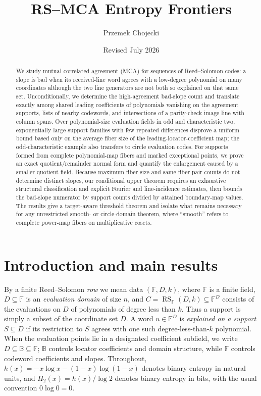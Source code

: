 \documentclass[12pt,a4paper]{amsart}
\title{RS--MCA Entropy Frontiers}
\author{Przemek Chojecki}
\date{Revised July 2026}
\numberwithin{equation}{section}
\theoremstyle{remark}
\DeclareMathOperator{\RS}{RS}
\newcommand{\F}{\mathbb F}
\newcommand{\B}{\mathbb B}
\begin{document}
\begin{abstract}
We study mutual correlated agreement (MCA) for sequences of Reed--Solomon
codes: a slope is bad when its received-line word agrees with a low-degree
polynomial on many coordinates although the two line generators are not
both so explained on that same set.  Unconditionally, we determine the
high-agreement bad-slope count and translate exactly among shared leading
coefficients of polynomials vanishing on the agreement supports, lists of
nearby codewords, and intersections of a parity-check image line with
column spans.  Over polynomial-size evaluation
fields in odd and characteristic two, exponentially large support families
with few repeated differences disprove a uniform bound based only on the
average fiber size of the leading-locator-coefficient map; the
odd-characteristic example also transfers to circle evaluation codes.  For
supports formed from complete polynomial-map
fibers and marked exceptional points, we prove an exact quotient/remainder
normal form and quantify the enlargement caused by a smaller quotient
field.  Because maximum fiber size and same-fiber pair counts do not
determine distinct slopes, our conditional upper theorem requires an
exhaustive structural classification and explicit Fourier and line-incidence
estimates, then bounds the bad-slope numerator by support counts divided by
attained boundary-map values.  The results give a target-aware threshold theorem and
isolate what remains necessary for any unrestricted smooth- or
circle-domain theorem, where ``smooth'' refers to complete power-map fibers
on multiplicative cosets.
\end{abstract}

\maketitle

\section{Introduction and main results}\label{sec:introduction}

By a finite Reed--Solomon \emph{row} we mean data
\((\F,D,k)\), where \(\F\) is a finite field,
\(D\subseteq\F\) is an \emph{evaluation domain} of size \(n\), and
\(C=\RS_\F(D,k)\subseteq\F^D\) consists of the evaluations on \(D\) of
polynomials of degree less than \(k\).  Thus a support is simply a subset
of the coordinate set \(D\).  A word \(u\in\F^D\) is
\emph{explained on a support} \(S\subseteq D\) if its restriction to
\(S\) agrees with one such degree-less-than-\(k\) polynomial.
When the evaluation points lie in a designated coefficient subfield, we
write \(D\subseteq\B\subseteq\F\); \(\B\) controls locator coefficients
and domain structure, while \(\F\) controls codeword coefficients and
slopes.
Throughout,
\(h(x)=-x\log x-(1-x)\log(1-x)\) denotes binary entropy in natural
units, and \(H_2(x)=h(x)/\log 2\) denotes binary entropy in bits, with the
usual convention \(0\log0=0\).
\end{document}
